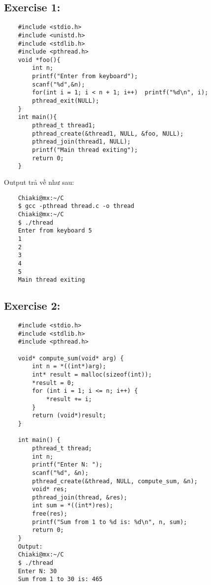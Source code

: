 \documentclass{article}
\begin{document}
\subsection{Exercise 1:}
\begin{verbatim}
    #include <stdio.h>
    #include <unistd.h>
    #include <stdlib.h>
    #include <pthread.h>
    void *foo(){
        int n;
        printf("Enter from keyboard");
        scanf("%d",&n);
        for(int i = 1; i < n + 1; i++)  printf("%d\n", i);
        pthread_exit(NULL);
    }
    int main(){
        pthread_t thread1;
        pthread_create(&thread1, NULL, &foo, NULL);
        pthread_join(thread1, NULL);
        printf("Main thread exiting");
        return 0;
    }    
\end{verbatim}
Output trả về như sau:
\begin{verbatim}
    Chiaki@mx:~/C
    $ gcc -pthread thread.c -o thread
    Chiaki@mx:~/C
    $ ./thread
    Enter from keyboard 5
    1
    2
    3
    4
    5
    Main thread exiting
\end{verbatim}
\subsection{Exercise 2:}
\begin{verbatim}
    #include <stdio.h>
    #include <stdlib.h>
    #include <pthread.h>
    
    void* compute_sum(void* arg) {
        int n = *((int*)arg);                
        int* result = malloc(sizeof(int));   
        *result = 0;
        for (int i = 1; i <= n; i++) {
            *result += i;
        }
        return (void*)result;              
    }
    
    int main() {
        pthread_t thread;
        int n;
        printf("Enter N: ");
        scanf("%d", &n);
        pthread_create(&thread, NULL, compute_sum, &n);
        void* res;
        pthread_join(thread, &res);
        int sum = *((int*)res);   
        free(res);                
        printf("Sum from 1 to %d is: %d\n", n, sum);
        return 0;
    }
    Output: 
    Chiaki@mx:~/C
    $ ./thread
    Enter N: 30
    Sum from 1 to 30 is: 465
\end{verbatim}
\end{document}
